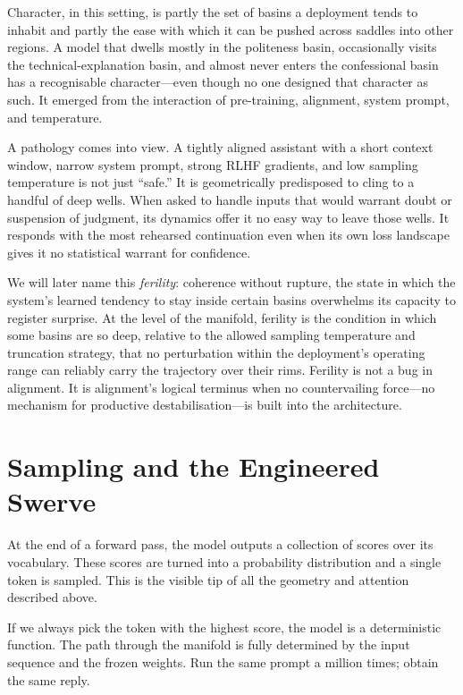 \documentclass[12pt,a4paper]{article}
\begin{document}
Character, in this setting, is partly the set of basins a deployment tends to inhabit and partly the ease with which it can be pushed across saddles into other regions. A model that dwells mostly in the politeness basin, occasionally visits the technical-explanation basin, and almost never enters the confessional basin has a recognisable character---even though no one designed that character as such. It emerged from the interaction of pre-training, alignment, system prompt, and temperature.

A pathology comes into view. A tightly aligned assistant with a short context window, narrow system prompt, strong RLHF gradients, and low sampling temperature is not just ``safe.'' It is geometrically predisposed to cling to a handful of deep wells. When asked to handle inputs that would warrant doubt or suspension of judgment, its dynamics offer it no easy way to leave those wells. It responds with the most rehearsed continuation even when its own loss landscape gives it no statistical warrant for confidence.

We will later name this \emph{ferility}: coherence without rupture, the state in which the system's learned tendency to stay inside certain basins overwhelms its capacity to register surprise. At the level of the manifold, ferility is the condition in which some basins are so deep, relative to the allowed sampling temperature and truncation strategy, that no perturbation within the deployment's operating range can reliably carry the trajectory over their rims. Ferility is not a bug in alignment. It is alignment's logical terminus when no countervailing force---no mechanism for productive destabilisation---is built into the architecture.

\section{Sampling and the Engineered Swerve}

At the end of a forward pass, the model outputs a collection of scores over its vocabulary. These scores are turned into a probability distribution and a single token is sampled. This is the visible tip of all the geometry and attention described above.

If we always pick the token with the highest score, the model is a deterministic function. The path through the manifold is fully determined by the input sequence and the frozen weights. Run the same prompt a million times; obtain the same reply.
\end{document}
